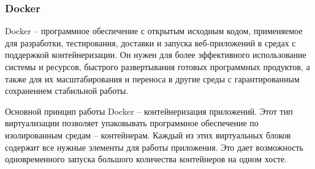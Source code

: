 \subsubsection{Docker}
	
Docker -- программное обеспечение с открытым исходным кодом, применяемое для разработки, тестирования, доставки и запуска веб-приложений в средах с поддержкой контейнеризации. Он нужен для более эффективного использование системы и ресурсов, быстрого развертывания готовых программных продуктов, а также для их масштабирования и переноса в другие среды с гарантированным сохранением стабильной работы.
	
Основной принцип работы Docker -- контейнеризация приложений. Этот тип виртуализации позволяет упаковывать программное обеспечение по изолированным средам -- контейнерам. Каждый из этих виртуальных блоков содержит все нужные элементы для работы приложения. Это дает возможность одновременного запуска большого количества контейнеров на одном хосте.
	
